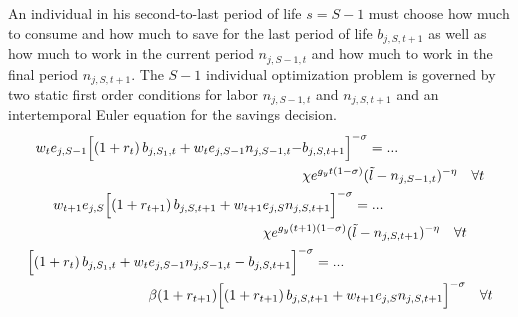 \documentclass[letterpaper,12pt]{article}
\theoremstyle{definition}
\begin{document}
\begin{spacing}{1.5}
    An individual in his second-to-last period of life $s=S-1$ must choose how much to consume and how much to save for the last period of life $b_{j,S,t+1}$ as well as how much to work in the current period $n_{j,S-1,t}$ and how much to work in the final period $n_{j,S,t+1}$. The $S-1$ individual optimization problem is governed by two static first order conditions for labor  $n_{j,S-1,t}$ and $n_{j,S,t+1}$ and an intertemporal Euler equation for the savings decision.
    \begin{gather}
      \begin{split}
        w_t e_{j,S-1}\Bigl[\left(1+r_t\right)b_{j,S_1,t} + w_t e_{j,S-1}n_{j,S-1,t} - &b_{j,S,t+1}\Bigr]^{-\sigma} = ... \\
        &\chi e^{g_y t(1-\sigma)}(\tilde{l} - n_{j,S-1,t})^{-\eta} \quad\forall t
      \end{split} \label{EqEulerSm1lab} \\
      \begin{split}
        w_{t+1} e_{j,S}\Bigl[\left(1+r_{t+1}\right)b_{j,S,t+1} + w_{t+1} &e_{j,S}n_{j,S,t+1}\Bigr]^{-\sigma} = ... \\
        &\chi e^{g_y (t+1)(1-\sigma)}(\tilde{l} - n_{j,S,t+1})^{-\eta} \quad\forall t \\
      \end{split} \label{EqEulerSlab2} \\
      \begin{split}
        \Bigl[\left(1+r_t\right)b_{j,S_1,t} + w_t &e_{j,S-1}n_{j,S-1,t} - b_{j,S,t+1}\Bigr]^{-\sigma} = ... \\
        &\beta(1+r_{t+1})\Bigl[\left(1+r_{t+1}\right)b_{j,S,t+1} + w_{t+1} e_{j,S}n_{j,S,t+1}\Bigr]^{-\sigma} \quad\forall t
      \end{split} \label{EqEulerSm1Sav}
    \end{gather}


\end{spacing}
\end{document}
